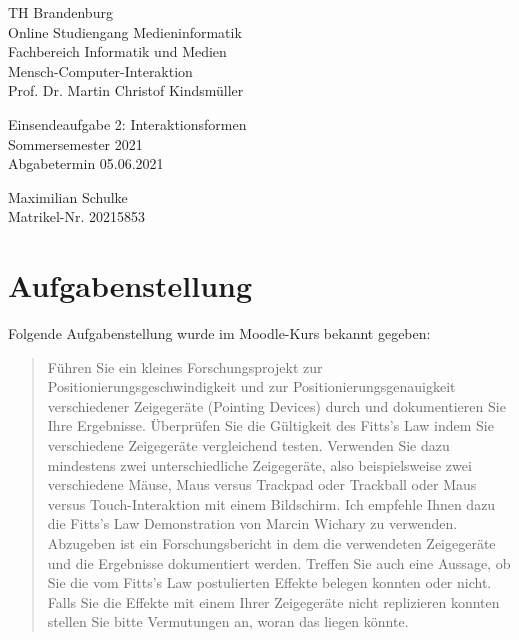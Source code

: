 \documentclass{article}
\begin{document}
\begin{titlepage}
	\begin{flushleft}
		TH Brandenburg \\
		Online Studiengang Medieninformatik \\
		Fachbereich Informatik und Medien \\
		Mensch-Computer-Interaktion \\
		Prof. Dr. Martin Christof Kindsmüller
	\end{flushleft}

	\vfill

	\begin{center}
		\Large{Einsendeaufgabe 2: Interaktionsformen}\\[0.5em]
		\large{Sommersemester 2021}\\[0.25em]
		\large{Abgabetermin 05.06.2021}
	\end{center}

	\vfill

	\begin{flushright}
		Maximilian Schulke \\
		Matrikel-Nr. 20215853
	\end{flushright}
\end{titlepage}

\tableofcontents

\vfill

\section{Aufgabenstellung}

Folgende Aufgabenstellung wurde im Moodle-Kurs bekannt gegeben:

\begin{quote}
	Führen Sie ein kleines Forschungsprojekt zur Positionierungsgeschwindigkeit
	und zur Positionierungsgenauigkeit verschiedener Zeigegeräte (Pointing
	Devices) durch und dokumentieren Sie Ihre Ergebnisse. Überprüfen Sie die
	Gültigkeit des Fitts's Law indem Sie verschiedene Zeigegeräte vergleichend
	testen. Verwenden Sie dazu mindestens zwei unterschiedliche Zeigegeräte,
	also beispielsweise zwei verschiedene Mäuse, Maus versus Trackpad oder
	Trackball oder Maus versus Touch-Interaktion mit einem Bildschirm. Ich
	empfehle Ihnen dazu die Fitts's Law Demonstration von Marcin Wichary zu
	verwenden. Abzugeben ist ein Forschungsbericht in dem die verwendeten
	Zeigegeräte und die Ergebnisse dokumentiert werden. Treffen Sie auch eine
	Aussage, ob Sie die vom Fitts's Law postulierten Effekte belegen konnten
	oder nicht. Falls Sie die Effekte mit einem Ihrer Zeigegeräte nicht
	replizieren konnten stellen Sie bitte Vermutungen an, woran das liegen
	könnte.
\end{quote}
\end{document}
